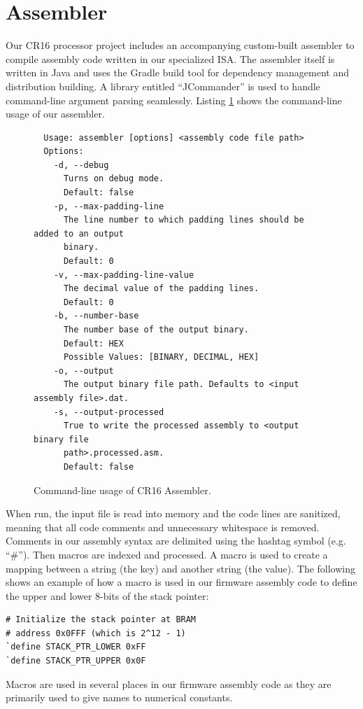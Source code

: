 \documentclass[conference]{IEEEtran}
\begin{document}
\section{Assembler}
Our CR16 processor project includes an accompanying custom-built assembler to compile assembly code written in our specialized ISA. The assembler itself is written in Java and uses the Gradle build tool for dependency management and distribution building. A library entitled ``JCommander'' is used to handle command-line argument parsing seamlessly. Listing \ref{listing:assembler_command_line} shows the command-line usage of our assembler.
\begin{figure}
  \begin{lstlisting}
  Usage: assembler [options] <assembly code file path>
  Options:
    -d, --debug
      Turns on debug mode.
      Default: false
    -p, --max-padding-line
      The line number to which padding lines should be added to an output
      binary.
      Default: 0
    -v, --max-padding-line-value
      The decimal value of the padding lines.
      Default: 0
    -b, --number-base
      The number base of the output binary.
      Default: HEX
      Possible Values: [BINARY, DECIMAL, HEX]
    -o, --output
      The output binary file path. Defaults to <input assembly file>.dat.
    -s, --output-processed
      True to write the processed assembly to <output binary file
      path>.processed.asm.
      Default: false
  \end{lstlisting}
  \caption{Command-line usage of CR16 Assembler.}
  \label{listing:assembler_command_line}
\end{figure}

When run, the input file is read into memory and the code lines are sanitized, meaning that all code comments and unnecessary whitespace is removed. Comments in our assembly syntax are delimited using the hashtag symbol (e.g. ``\#''). Then macros are indexed and processed. A macro is used to create a mapping between a string (the key) and another string (the value). The following shows an example of how a macro is used in our firmware assembly code to define the upper and lower 8-bits of the stack pointer:
\begin{verbatim}
# Initialize the stack pointer at BRAM
# address 0x0FFF (which is 2^12 - 1)
`define STACK_PTR_LOWER 0xFF
`define STACK_PTR_UPPER 0x0F
\end{verbatim}
Macros are used in several places in our firmware assembly code as they are primarily used to give names to numerical constants.
\end{document}
